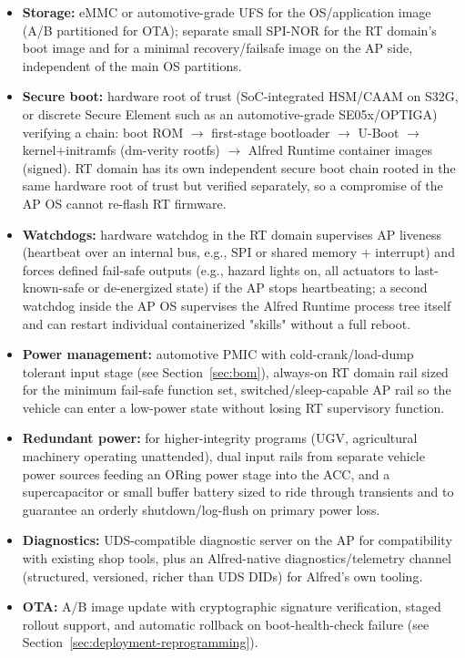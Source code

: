 \begin{itemize}
\item \textbf{Storage:} eMMC or automotive-grade UFS for the OS/application image (A/B partitioned for OTA); separate small SPI-NOR for the RT domain's boot image and for a minimal recovery/failsafe image on the AP side, independent of the main OS partitions.
\item \textbf{Secure boot:} hardware root of trust (SoC-integrated HSM/CAAM on S32G, or discrete Secure Element such as an automotive-grade SE05x/OPTIGA) verifying a chain: boot ROM $\rightarrow$ first-stage bootloader $\rightarrow$ U-Boot $\rightarrow$ kernel+initramfs (dm-verity rootfs) $\rightarrow$ Alfred Runtime container images (signed). RT domain has its own independent secure boot chain rooted in the same hardware root of trust but verified separately, so a compromise of the AP OS cannot re-flash RT firmware.
\item \textbf{Watchdogs:} hardware watchdog in the RT domain supervises AP liveness (heartbeat over an internal bus, e.g., SPI or shared memory + interrupt) and forces defined fail-safe outputs (e.g., hazard lights on, all actuators to last-known-safe or de-energized state) if the AP stops heartbeating; a second watchdog inside the AP OS supervises the Alfred Runtime process tree itself and can restart individual containerized "skills" without a full reboot.
\item \textbf{Power management:} automotive PMIC with cold-crank/load-dump tolerant input stage (see Section~\ref{sec:bom}), always-on RT domain rail sized for the minimum fail-safe function set, switched/sleep-capable AP rail so the vehicle can enter a low-power state without losing RT supervisory function.
\item \textbf{Redundant power:} for higher-integrity programs (UGV, agricultural machinery operating unattended), dual input rails from separate vehicle power sources feeding an ORing power stage into the ACC, and a supercapacitor or small buffer battery sized to ride through transients and to guarantee an orderly shutdown/log-flush on primary power loss.
\item \textbf{Diagnostics:} UDS-compatible diagnostic server on the AP for compatibility with existing shop tools, plus an Alfred-native diagnostics/telemetry channel (structured, versioned, richer than UDS DIDs) for Alfred's own tooling.
\item \textbf{OTA:} A/B image update with cryptographic signature verification, staged rollout support, and automatic rollback on boot-health-check failure (see Section~\ref{sec:deployment-reprogramming}).

\end{itemize}
